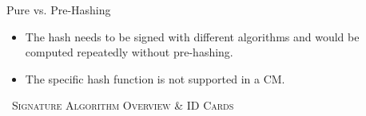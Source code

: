 \documentclass[11pt,english,a4paper, landscape]{scrartcl}
\begin{document}
\begin{minipage}[t]{0.28\textwidth}
\begin{algorithmbox}{Pure vs. Pre-Hashing}
\begin{itemize}[leftmargin=*]
\begin{itemize}[leftmargin=*]
					\item The hash needs to be signed with different algorithms and would be computed repeatedly without pre-hashing.
					\item The specific hash function is not supported in a CM.
				\end{itemize}
			\end{itemize}
			\vspace{0.75mm}
		\end{algorithmbox}
	\end{minipage}




	\newpage
	{\large \scshape \faPen\, Signature Algorithm Overview \& ID Cards}\\
\end{document}
